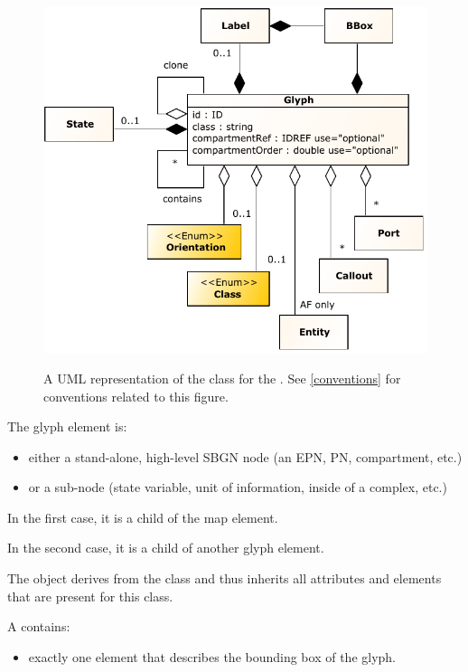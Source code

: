 \begin{figure}[ht!]
  \centering
  \includegraphics[scale=1.0]{figures/sbgnml_glyph_uml.pdf}\\
\caption{A UML representation of the \Glyph class for the
\SbgnmlPackage. See \ref{conventions} for conventions related to this
figure. }
  \label{fig:sbgnml_glyph_uml}
\end{figure}


The glyph element is:

\begin{itemize}
	\item {either a stand-alone, high-level SBGN node (an EPN, PN, compartment, etc.)}
\item {or a sub-node (state variable, unit of information, inside of a complex, etc.)}

\end{itemize}

In the first case, it is a child of the map element.

In the second case, it is a child of another glyph element.

The \Glyph object derives from the \SbgnBase class and thus inherits all
attributes and elements that are present for this class.

A \Glyph contains: 

\begin{itemize}
  \item exactly one \BBox element that describes the bounding box of the glyph.
\end{itemize}

